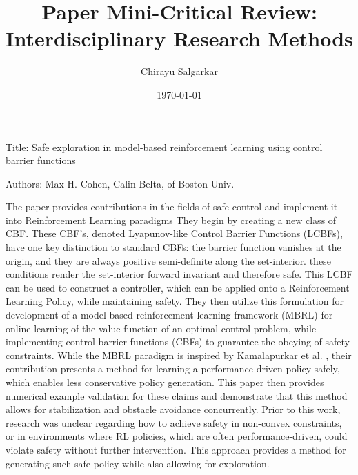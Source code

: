 \documentclass[10pt, oneside]{article}
\title{Paper Mini-Critical Review: Interdisciplinary Research Methods}
\author{Chirayu Salgarkar}
\date{\today}
\newenvironment{problem}[2][Problem]{\begin{trivlist}
    \item[\hskip \labelsep {\bfseries #1}\hskip \labelsep {\bfseries #2.}]}{\end{trivlist}}
\begin{document}
\maketitle

\begin{problem}{$\#1$} 
Title: Safe exploration in model-based reinforcement learning using control barrier functions
\end{problem}

\begin{problem}{$\#2$}
Authors: Max H. Cohen, Calin Belta, of Boston Univ.
\end{problem}




\begin{problem}{$\#3$}
 The paper provides contributions in the fields of safe control and implement it into Reinforcement Learning paradigms They begin by creating a new class of CBF. These CBF's, denoted Lyapunov-like Control Barrier Functions (LCBFs), have one key distinction to standard CBFs: the barrier function vanishes at the origin, and they are always positive semi-definite along the set-interior. these conditions render the set-interior forward invariant and therefore safe. This LCBF can be used to construct a controller, which can be applied onto a Reinforcement Learning Policy, while maintaining safety. They then utilize this formulation for development of a model-based reinforcement learning framework (MBRL) for online learning of the value function of an optimal control problem, while implementing control barrier functions (CBFs) to guarantee the obeying of safety constraints. While the MBRL paradigm is inspired by Kamalapurkar et al. \cite{KAMALAPURKAR2016247}, their contribution presents a method for learning a performance-driven policy safely, which enables less conservative policy generation. This paper then provides numerical example validation for these claims and demonstrate that this method allows for stabilization and obstacle avoidance concurrently. Prior to this work, research was unclear regarding how to achieve safety in non-convex constraints, or in environments where RL policies, which are often performance-driven, could violate safety without further intervention. This approach provides a method for generating such safe policy while also allowing for exploration. 
\end{problem}
\end{document}
